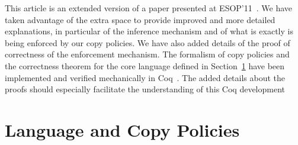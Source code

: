 \documentclass{LMCS}
\begin{document}
This article is an extended version of a paper presented at ESOP'11~\cite{JensenKP:Esop11}.
We have taken advantage of the extra space to provide improved and more detailed
explanations, in particular of the inference mechanism and of what is
exactly is being enforced by our copy policies. We have also added
details of the proof of correctness of the enforcement
mechanism. The formalism of copy policies and the correctness theorem
for the core language defined in Section~\ref{section-annotations} have been
implemented and verified mechanically in Coq~\cite{clone-webpage}.
The added details about the proofs should especially facilitate the 
understanding of this Coq development
















\section{Language and Copy Policies}\label{section-annotations}
\end{document}
